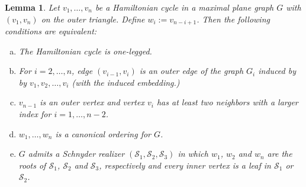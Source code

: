 \documentclass[11pt]{article}
\newtheorem{lemma}{Lemma}[section]
\begin{document}
\begin{lemma}\label{lem:Hamilton-property}
  Let $v_1,\ldots,v_n$ be a Hamiltonian cycle in a maximal plane graph
  $G$ with $(v_1,v_n)$ on the outer triangle. Define $w_i := v_{n-i+1}$.
  Then the following conditions are equivalent:
  \begin{enumerate}[(a)]
  \item The Hamiltonian cycle is one-legged.\label{enum:one-legged}
  \item For $i=2,\ldots,n$, edge $(v_{i-1},v_i)$ is an outer edge
of the graph $G_i$ induced by
by $v_1,v_2,\ldots,v_i$ (with the induced embedding.)
\label{enum:outer-edge}
  \item $v_{n-1}$ is an outer vertex and vertex $v_i$ has at least
    two neighbors with a larger index for
    $i=1,\ldots,n-2$.\label{enum:two-back}
  \item $w_1,\ldots,w_n$ is a canonical ordering for
    $G$.\label{enum:canonical-ordering}
 \item $G$ admits a Schnyder realizer $(\mathcal{S}_1,\mathcal{S}_2,\mathcal{S}_3)$ in which
   $w_1$, $w_2$ and $w_n$ are the roots of $\mathcal{S}_1$, $\mathcal{S}_2$ and $\mathcal{S}_3$, respectively
   and every inner vertex is a leaf in $\mathcal{S}_1$ or $\mathcal{S}_2$.\label{enum:Schnyder-wood}
  \end{enumerate}
\end{lemma}
\end{document}
